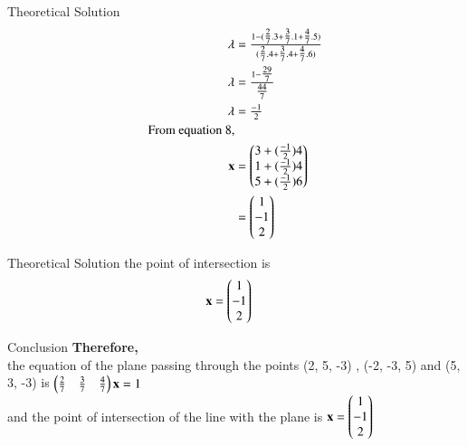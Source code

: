 \documentclass{beamer}
\begin{document}
\begin{frame}{Theoretical Solution }
\begin{align}
\lambda&=\tfrac{1-(\tfrac{2}{7}.3+\tfrac{3}{7}.1+\tfrac{4}{7}.5)}{(\tfrac{2}{7}.4+\tfrac{3}{7}.4+\tfrac{4}{7}.6)}\\
\lambda&=\tfrac{1-\tfrac{29}{7}}{\tfrac{44}{7}}\\
\lambda&=\tfrac{-1}{2}\\
\text{From equation 8,}\\
\mathbf{x}&=\begin{pmatrix}3+(\tfrac{-1}{2})4\\1+(\tfrac{-1}{2})4\\5+(\tfrac{-1}{2})6\end{pmatrix}\\
&=\begin{pmatrix}1\\-1\\2\end{pmatrix}
\end{align}
\end{frame}
\begin{frame}{Theoretical Solution }
the point of intersection is
\begin{align}
\mathbf{x}&=\begin{pmatrix}1\\-1\\2\end{pmatrix}
\end{align}
\end{frame}
\begin{frame}{Conclusion}
\textbf{Therefore,}\\
the equation of the plane passing through the points (2, 5, -3) , (-2, -3, 5) and
(5, 3, -3) is $\begin{pmatrix}\tfrac{2}{7}&\tfrac{3}{7} &\tfrac{4}{7}\end{pmatrix}\mathbf{x}=1$\\
and the point of intersection of the line with the plane is $\mathbf{x}=\begin{pmatrix}1\\-1\\2\end{pmatrix}$
\end{frame}
\end{document}
